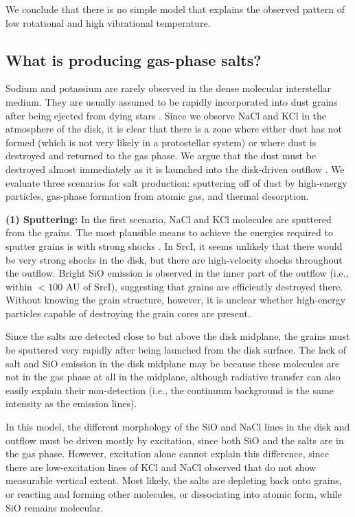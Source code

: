 \documentclass[twocolumn]{aastex62}
\newcommand{\sourcei}{SrcI\xspace}
\begin{document}
We conclude that there is no simple model that explains the observed pattern of
low rotational and high vibrational temperature.



\subsection{What is producing gas-phase salts?}

Sodium and potassium are rarely observed in the dense molecular interstellar
medium.  They are usually assumed to be rapidly incorporated into dust grains
after being ejected from dying stars \citep[e.g.,][]{Milam2007a}.  Since we
observe NaCl and KCl in the atmosphere of the disk, it is clear that
there is a zone where either dust has not  formed  (which is not very likely
in a protostellar system)
or
where dust is destroyed and returned to the gas phase.  We argue that the dust
must be destroyed almost immediately as it is launched into the disk-driven
outflow \citep{Hirota2017b}. We evaluate three scenarios for salt production:
sputtering off of dust by high-energy particles, gas-phase formation from
atomic gas, and thermal desorption.


\textbf{(1) Sputtering:}
In the first scenario, NaCl and KCl molecules are sputtered from the grains.
The most plausible means to achieve the energies required to sputter grains is
with strong shocks \citep{Schilke1997a,Decin2016a}.  In \sourcei, it seems
unlikely that there would be very strong shocks in the disk, but there are
high-velocity shocks throughout the outflow.  Bright SiO emission is observed in
the inner part of the outflow (i.e., within $<100$ AU of \sourcei), suggesting
that grains are efficiently destroyed there.  Without knowing the grain
structure, however, it is unclear whether high-energy particles capable of
destroying the grain cores are present.

Since the salts are detected close to but above the disk midplane, the
grains must be sputtered very rapidly after being launched from the disk surface.
The lack of salt and SiO emission in the disk midplane may be because these
molecules are not in the gas phase at all in the midplane, although radiative
transfer can also easily explain their non-detection (i.e., the continuum
background is the same intensity as the emission lines).

In this model, the different morphology of the SiO and NaCl lines in the disk
and outflow must be driven mostly by excitation, since both SiO and the salts are
in the gas phase.  However, excitation alone cannot explain this difference,
since there are low-excitation lines of KCl and NaCl observed that do not
show measurable vertical extent.  Most likely, the salts are depleting back onto
grains, or reacting and forming other molecules, or dissociating into 
atomic form, while SiO remains molecular.
\end{document}
